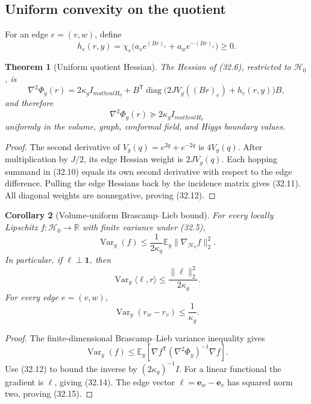 \documentclass[11pt]{article}
\newtheorem{theorem}{Theorem}[section]
\newtheorem{corollary}[theorem]{Corollary}
\theoremstyle{remark}
\begin{document}
\subsection{Uniform convexity on the quotient}

For an edge \(e=(v,w)\), define
\[
 h_e(r,y)=\chi_e
 \bigl(a_ve^{(Br)_e}+a_we^{-(Br)_e}\bigr)\geq0.    \tag{32.10}
\]

\begin{theorem}[Uniform quotient Hessian]
\label{thm:v17v32-hessian}
The Hessian of (32.6), restricted to \(\mathcal H_0\), is
\[
 \nabla^2\Phi_y(r)
 =2\kappa_gI_{mathcal H_0}
 +B^{\mathsf T}\operatorname{diag}
 \bigl(2JV_g((Br)_e)+h_e(r,y)\bigr)B,              \tag{32.11}
\]
and therefore
\[
 \nabla^2\Phi_y(r)\succeq2\kappa_gI_{mathcal H_0}             \tag{32.12}
\]
uniformly in the volume, graph, conformal field, and Higgs boundary
values.
\end{theorem}

\begin{proof}
The second derivative of \(V_g(q)=e^{2q}+e^{-2q}\) is \(4V_g(q)\).
After multiplication by \(J/2\), its edge Hessian weight is
\(2JV_g(q)\).  Each hopping summand in (32.10) equals its own second
derivative with respect to the edge difference.  Pulling the edge
Hessians back by the incidence matrix gives (32.11).  All diagonal
weights are nonnegative, proving (32.12).
\end{proof}

\begin{corollary}[Volume-uniform Brascamp--Lieb bound]
\label{cor:v17v32-bl}
For every locally Lipschitz \(f:\mathcal H_0\to\mathbb R\) with finite
variance under (32.5),
\[
 \operatorname{Var}_y(f)
 \leq\frac{1}{2\kappa_g}
 \mathbb E_y\|\nabla_{\mathcal H_0}f\|_2^2.        \tag{32.13}
\]
In particular, if \(\ell\perp\mathbf1\), then
\[
 \operatorname{Var}_y\langle\ell,r\rangle
 \leq\frac{\|\ell\|_2^2}{2\kappa_g}.             \tag{32.14}
\]
For every edge \(e=(v,w)\),
\[
 \operatorname{Var}_y(r_w-r_v)\leq\frac1{\kappa_g}.             \tag{32.15}
\]
\end{corollary}

\begin{proof}
The finite-dimensional Brascamp--Lieb variance inequality gives
\[
 \operatorname{Var}_y(f)
 \leq\mathbb E_y\left[
 \nabla f^{\mathsf T}(\nabla^2\Phi_y)^{-1}\nabla f
 \right].                                         \tag{32.16}
\]
Use (32.12) to bound the inverse by
\((2\kappa_g)^{-1}I\).  For a linear functional the gradient is
\(\ell\), giving (32.14).  The edge vector
\(\ell=\mathbf e_w-\mathbf e_v\) has squared norm two, proving
(32.15).
\end{proof}
\end{document}
